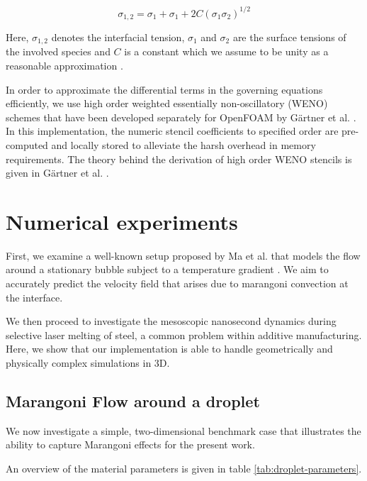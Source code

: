 \documentclass[conference,final,a4paper]{IEEEtran}
\begin{document}
\begin{equation}
    \sigma_{1,2} = \sigma_1 + \sigma_1 + 2C (\sigma_1 \sigma_2)^{1/2}
\end{equation}

Here, $\sigma_{1,2}$ denotes the interfacial tension, $\sigma_1$ and $\sigma_2$ are the surface tensions of the involved species and $C$ is a constant which we assume to be unity as a reasonable approximation \cite{marmurCorrelatingInterfacialTensions2010}.

In order to approximate the differential terms in the governing equations efficiently, we use high order weighted essentially non-oscillatory (WENO) schemes that have been developed separately for OpenFOAM by Gärtner et al. \cite{gartnerEfficientWENOLibrary2020,martinImplementationValidationSemiImplicit2018}. In this implementation, the numeric stencil coefficients to specified order are pre-computed and locally stored to alleviate the harsh overhead in memory requirements. The theory behind the derivation of high order WENO stencils is given in Gärtner et al. \cite{gartnerEfficientWENOLibrary2020}.

\section{Numerical experiments}

First, we examine a well-known setup proposed by Ma et al. that models the flow around a stationary bubble subject to a temperature gradient \cite{maDirectNumericalSimulation2011}. We aim to accurately predict the velocity field that arises due to marangoni convection at the interface.

We then proceed to investigate the mesoscopic nanosecond dynamics during selective laser melting of steel, a common problem within additive manufacturing. Here, we show that our implementation is able to handle geometrically and physically complex simulations in 3D.


\subsection{Marangoni Flow around a droplet}\label{sec:droplet}

We now investigate a simple, two-dimensional benchmark case that illustrates the ability to capture Marangoni effects for the present work.

An overview of the material parameters is given in table \ref{tab:droplet-parameters}.
\end{document}
